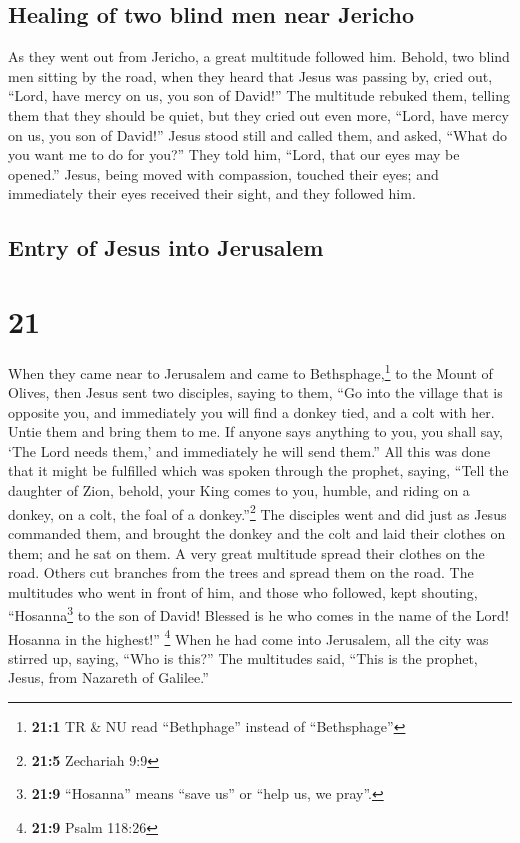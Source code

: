 \hypertarget{healing-of-two-blind-men-near-jericho}{%
\subsection{Healing of two blind men near
Jericho}\label{healing-of-two-blind-men-near-jericho}}

 As they went out from Jericho, a great multitude
followed him.  Behold, two blind men sitting by the road,
when they heard that Jesus was passing by, cried out, ``Lord, have mercy
on us, you son of David!''  The multitude rebuked them,
telling them that they should be quiet, but they cried out even more,
``Lord, have mercy on us, you son of David!''  Jesus
stood still and called them, and asked, ``What do you want me to do for
you?''  They told him, ``Lord, that our eyes may be
opened.''  Jesus, being moved with compassion, touched
their eyes; and immediately their eyes received their sight, and they
followed him.

\hypertarget{entry-of-jesus-into-jerusalem}{%
\subsection{Entry of Jesus into
Jerusalem}\label{entry-of-jesus-into-jerusalem}}

\hypertarget{section-20}{%
\section{21}\label{section-20}}

 When they came near to Jerusalem and came to
Bethsphage,\footnote{\textbf{21:1} TR \& NU read ``Bethphage'' instead
  of ``Bethsphage''} to the Mount of Olives, then Jesus sent two
disciples,  saying to them, ``Go into the village that is
opposite you, and immediately you will find a donkey tied, and a colt
with her. Untie them and bring them to me.  If anyone says
anything to you, you shall say, `The Lord needs them,' and immediately
he will send them.''  All this was done that it might be
fulfilled which was spoken through the prophet, saying, 
``Tell the daughter of Zion, behold, your King comes to you, humble, and
riding on a donkey, on a colt, the foal of a donkey.''\footnote{\textbf{21:5}
  Zechariah 9:9}  The disciples went and did just as Jesus
commanded them,  and brought the donkey and the colt and
laid their clothes on them; and he sat on them.  A very
great multitude spread their clothes on the road. Others cut branches
from the trees and spread them on the road.  The
multitudes who went in front of him, and those who followed, kept
shouting, ``Hosanna\footnote{\textbf{21:9} ``Hosanna'' means ``save us''
  or ``help us, we pray''.} to the son of David! Blessed is he who comes
in the name of the Lord! Hosanna in the highest!'' \footnote{\textbf{21:9}
  Psalm 118:26}  When he had come into Jerusalem, all the
city was stirred up, saying, ``Who is this?''  The
multitudes said, ``This is the prophet, Jesus, from Nazareth of
Galilee.''

